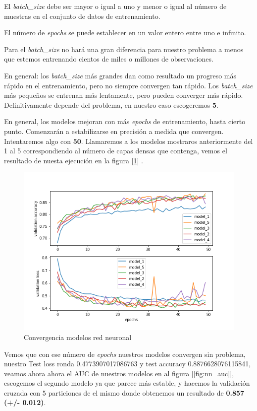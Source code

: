 \documentclass[12pt,twoside]{report}
\begin{document}
El \textit{batch\_size} debe ser mayor o igual a uno y menor o igual al número de muestras en el conjunto de datos de entrenamiento.

El número de \textit{epochs} se puede establecer en un valor entero entre uno e infinito. 

Para el \textit{batch\_size} no hará una gran diferencia para nuestro problema a menos que estemos entrenando cientos de miles o millones de observaciones.

En general: los \textit{batch\_size} más grandes dan como resultado un progreso más rápido en el entrenamiento, pero no siempre convergen tan rápido. Los \textit{batch\_size} más pequeños se entrenan más lentamente, pero pueden converger más rápido. Definitivamente depende del problema, en nuestro caso escogeremos \textbf{5}.

En general, los modelos mejoran con más \textit{epochs} de entrenamiento, hasta cierto punto. Comenzarán a estabilizarse en precisión a medida que convergen. Intentaremos algo con \textbf{50}. Llamaremos a los modelos mostraros anteriormente del 1 al 5 correspondiendo al número de capas densas que contenga, vemos el resultado de nuesta ejecución en la figura [\ref{fig:nn_convergencia}] .

\begin{figure}[H]
\includegraphics[width=\textwidth]{../notebooks/figures/validation_nn.png}
\caption{Convergencia modelos red neuronal}
\label{fig:nn_convergencia}
\end{figure} 

Vemos que con ese número de \textit{epochs} nuestros modelos convergen sin problema, nuestro Test loss ronda 0.4773907017086763 y test accuracy 0.8876628076115841, veamos ahora ahora el AUC de nuestros modelos en al figura [\ref{fig:nn_auc}], escogemos el segundo modelo ya que parece más estable, y hacemos la validación cruzada con 5 particiones de el mismo donde obtenemos un resultado de \textbf{0.857 (+/- 0.012)}. 
\end{document}
